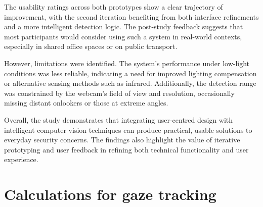 \documentclass[12pt]{article}
\theoremstyle{plain}
\theoremstyle{definition}
\begin{document}
The usability ratings across both prototypes show a clear trajectory of improvement, with the second iteration benefiting from both interface refinements and a more intelligent detection logic. The post-study feedback suggests that most participants would consider using such a system in real-world contexts, especially in shared office spaces or on public transport.

However, limitations were identified. The system’s performance under low-light conditions was less reliable, indicating a need for improved lighting compensation or alternative sensing methods such as infrared. Additionally, the detection range was constrained by the webcam’s field of view and resolution, occasionally missing distant onlookers or those at extreme angles.

Overall, the study demonstrates that integrating user-centred design with intelligent computer vision techniques can produce practical, usable solutions to everyday security concerns. The findings also highlight the value of iterative prototyping and user feedback in refining both technical functionality and user experience.

\printbibliography 

\clearpage\appendix

\section{Calculations for gaze tracking}
\label{app:gaze_calcs}


\end{document}

